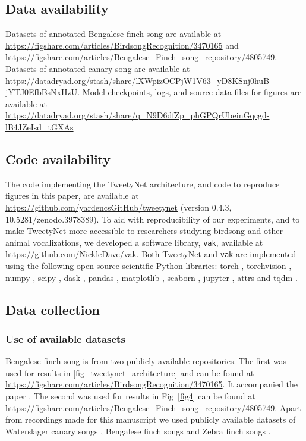 \documentclass[10pt,letterpaper]{article}
\begin{document}
\subsection*{Data availability}
Datasets of annotated Bengalese finch song are available at 
\url{https://figshare.com/articles/BirdsongRecognition/3470165} and  \url{https://figshare.com/articles/Bengalese_Finch_song_repository/4805749}.
Datasets of annotated canary song are available at \url{ https://datadryad.org/stash/share/lXWpizOCPjW1V63_yD8KSnj0huB-jYTJ0EfbBsNxHzU}.
Model checkpoints, logs, and source data files for figures are available at \url{https://datadryad.org/stash/share/q_N9D6dfZp_phGPQrUbeinGqcgd-lB4JZeIsd_tGXAs}

\subsection*{Code availability}
\label{methods:code}
The code implementing the TweetyNet architecture,
and code to reproduce figures in this paper, are available at
\url{https://github.com/yardencsGitHub/tweetynet}
(version 0.4.3, 10.5281/zenodo.3978389).
To aid with reproducibility of our experiments,
and to make TweetyNet more accessible to researchers studying birdsong
and other animal vocalizations, we developed a software library, 
\texttt{vak}, available at \url{https://github.com/NickleDave/vak}.
Both TweetyNet and \texttt{vak} are implemented using 
the following open-source scientific Python libraries: 
torch \cite{paszke_automatic_2017}, 
torchvision \cite{marcel_torchvision_2010}, 
numpy \cite{walt_numpy_2011, harris2020array}, 
scipy \cite{virtanen_scipy_2020}, 
dask \cite{dask_development_team_dask_2016}, 
pandas \cite{team_pandas-devpandas_2020}, 
matplotlib \cite{Hunter:2007,thomas_a_caswell_2020_4030140}, 
seaborn \cite{michael_waskom_2020_4019146}, 
jupyter \cite{kluyver2016jupyter},
attrs \cite{attrs}
and tqdm \cite{casper_da_costa_luis_2020_4054194}.

\subsection*{Data collection}
\subsubsection*{Use of available datasets}
Bengalese finch song is from two publicly-available repositories. 
The first \cite{koumura_birdsongrecognition_2016} was used for results in \ref{fig_tweetynet_architecture} and can be found at 
\url{https://figshare.com/articles/BirdsongRecognition/3470165}. It accompanied the paper \cite{koumura_automatic_2016-1}.
The second \cite{nicholson_bengalese_2017} was used for results in Fig~\ref{fig4} can be found at \url{https://figshare.com/articles/Bengalese_Finch_song_repository/4805749}.
Apart from recordings made for this manuscript we used publicly available datasets of Waterslager canary songs \cite{markowitz_long-range_2013}, Bengalese finch songs \cite{koumura_automatic_2016-1} and Zebra finch songs \cite{otchy_acute_2015}.
\end{document}
